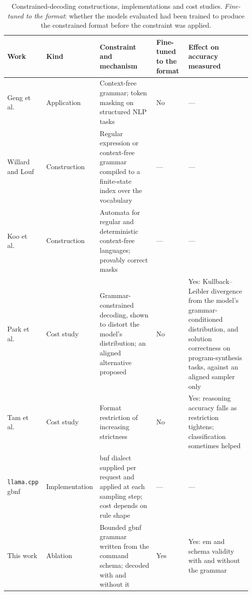 \begin{table}[htbp]
\centering
\footnotesize
\caption[Constrained-decoding constructions, implementations and cost studies]{Constrained-decoding
constructions, implementations and cost studies. \emph{Fine-tuned to the format}: whether the
models evaluated had been trained to produce the constrained format before the constraint was
applied.}
\label{tab:soa-constrained}
\begin{tabularx}{\textwidth}{@{}>{\raggedright\arraybackslash}p{2.3cm} >{\raggedright\arraybackslash}p{2.5cm} >{\raggedright\arraybackslash}X >{\raggedright\arraybackslash}p{1.8cm} >{\raggedright\arraybackslash}X@{}}
\toprule
Work & Kind & Constraint and mechanism & Fine-tuned to the format & Effect on accuracy measured \\
\midrule
Geng et al.~\cite{geng2023} & Application & Context-free grammar; token masking on structured NLP tasks & No & --- \\
Willard and Louf~\cite{willard2023} & Construction & Regular expression or context-free grammar compiled to a finite-state index over the vocabulary & --- & --- \\
Koo et al.~\cite{koo2024} & Construction & Automata for regular and deterministic context-free languages; provably correct masks & --- & --- \\
Park et al.~\cite{park2024} & Cost study & Grammar-constrained decoding, shown to distort the model's distribution; an aligned alternative proposed & No & Yes: Kullback--Leibler divergence from the model's grammar-conditioned distribution, and solution correctness on program-synthesis tasks, against an aligned sampler only \\
Tam et al.~\cite{tam2024} & Cost study & Format restriction of increasing strictness & No & Yes: reasoning accuracy falls as restriction tightens; classification sometimes helped \\
\texttt{llama.cpp} \gls{gbnf}~\cite{llamacpp} & Implementation & \gls{bnf} dialect supplied per request and applied at each sampling step; cost depends on rule shape & --- & --- \\
\midrule
This work & Ablation & Bounded \gls{gbnf} grammar written from the command schema; decoded with and without it & Yes & Yes: \gls{em} and schema validity with and without the grammar \\
\bottomrule
\end{tabularx}
\end{table}

